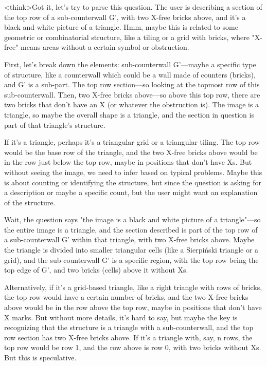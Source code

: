 <think>Got it, let's try to parse this question. The user is describing a section of the top row of a sub-counterwall G', with two X-free bricks above, and it's a black and white picture of a triangle. Hmm, maybe this is related to some geometric or combinatorial structure, like a tiling or a grid with bricks, where "X-free" means areas without a certain symbol or obstruction. 

First, let's break down the elements: sub-counterwall G'—maybe a specific type of structure, like a counterwall which could be a wall made of counters (bricks), and G' is a sub-part. The top row section—so looking at the topmost row of this sub-counterwall. Then, two X-free bricks above—so above this top row, there are two bricks that don't have an X (or whatever the obstruction is). The image is a triangle, so maybe the overall shape is a triangle, and the section in question is part of that triangle's structure.

If it's a triangle, perhaps it's a triangular grid or a triangular tiling. The top row would be the base row of the triangle, and the two X-free bricks above would be in the row just below the top row, maybe in positions that don't have Xs. But without seeing the image, we need to infer based on typical problems. Maybe this is about counting or identifying the structure, but since the question is asking for a description or maybe a specific count, but the user might want an explanation of the structure.

Wait, the question says "the image is a black and white picture of a triangle"—so the entire image is a triangle, and the section described is part of the top row of a sub-counterwall G' within that triangle, with two X-free bricks above. Maybe the triangle is divided into smaller triangular cells (like a Sierpiński triangle or a grid), and the sub-counterwall G' is a specific region, with the top row being the top edge of G', and two bricks (cells) above it without Xs.

Alternatively, if it's a grid-based triangle, like a right triangle with rows of bricks, the top row would have a certain number of bricks, and the two X-free bricks above would be in the row above the top row, maybe in positions that don't have X marks. But without more details, it's hard to say, but maybe the key is recognizing that the structure is a triangle with a sub-counterwall, and the top row section has two X-free bricks above. If it's a triangle with, say, n rows, the top row would be row 1, and the row above is row 0, with two bricks without Xs. But this is speculative.


